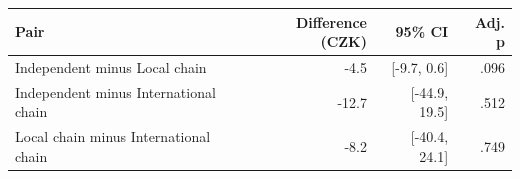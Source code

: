 \begin{tabular}{lrrr}
\toprule
Pair & Difference (CZK) & 95\% CI & Adj. p \\
\midrule
Independent minus Local chain & -4.5 & [-9.7, 0.6] & .096 \\
Independent minus International chain & -12.7 & [-44.9, 19.5] & .512 \\
Local chain minus International chain & -8.2 & [-40.4, 24.1] & .749 \\
\bottomrule
\end{tabular}
